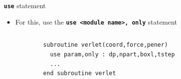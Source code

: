 \documentclass[slidestop,mathserif,compress,xcolor=svgnames]{beamer}
\newenvironment{eblock}[0]
{
\begin{beamerboxesrounded}[upper=uppercol2,lower=lowercol2,shadow=true]}
{\end{beamerboxesrounded}}
\begin{document}
\begin{frame}
\begin{block}{\scriptsize \textbf{\texttt{use}} statement}
\begin{itemize}
      \item For this, use the \textbf{\texttt{use <module name>, only}} statement
      {\fontsize{4}{5}
        \begin{columns}
          \column{7cm}
          \begin{eblock}{}
            \begin{verbatim}
        subroutine verlet(coord,force,pener)
          use param,only : dp,npart,boxl,tstep
          ...
        end subroutine verlet
            \end{verbatim}
          \end{eblock}
        \end{columns}
      }
    \end{itemize}
  \end{block}
\end{frame}
\end{document}
